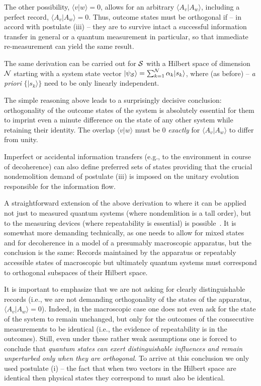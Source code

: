 \documentclass[aps,amsmath,amssymb,amsfonts,12pt]{revtex4-1}
\newcommand{\ket}[1]    {| #1 \rangle}
\newcommand{\bk}[2]     {\langle #1 | #2 \rangle}
\newcommand{\+}         {\dagger}
\begin{document}
The other possibility, $\bk v w = 0$, allows for an arbitrary $\bk {A_v} {A_w}$, including a perfect
record, $\bk {A_v} {A_w}=0$. Thus, outcome states must be orthogonal if -- in accord with postulate (iii) -- they are to survive intact a
successful information transfer in general or a quantum measurement in particular, so that immediate re-measurement can yield the same result.

The same derivation can be carried out for ${\cal S}$ with a Hilbert space of
dimension ${\cal N}$ starting with a system state vector $\ket {\psi_{\cal S}}=\sum_{k=1}^{\cal N}\alpha_k \ket {s_k}$,
where (as before) -- {\it a priori} $\{\ket {s_k} \}$ need to be only linearly independent.

The simple reasoning above leads to a surprisingly decisive conclusion: orthogonality of the outcome states of the system is absolutely
essential for them to imprint even a minute difference on the state of any other system while retaining their
identity. The overlap $\bk v  w$ must be 0 {\it exactly} for $\bk {A_v} {A_w}$ to differ from unity. 

Imperfect or accidental information transfers (e.g., to the environment in course of decoherence) can also define
preferred sets of states providing that the crucial nondemolition demand of postulate (iii) is imposed on the unitary evolution responsible for the information flow.

A straightforward extension of the above derivation to where it can be applied not just to measured quantum systems (where nondemlition is a tall order), but to the measuring devices (where repeatability is essential) is possible~\cite{79,Z2013}. It is somewhat more demanding technically, as one needs to allow for mixed states and for decoherence in a model of a presumably macroscopic apparatus, but the conclusion is the same: Records maintained by the apparatus or repeatably accessible states of macroscopic but ultimately quantum systems must correspond to orthogonal subspaces of their Hilbert space.

It is important to emphasize that we are not asking for clearly distinguishable records (i.e., we are not demanding orthogonality of the states of the apparatus, $\bk {A_v} {A_w}=0$). 
Indeed, in the macroscopic case \cite{Z2013} one does not even ask for the state of the system to remain unchanged, but only for the outcomes of the consecutive measurements to be identical (i.e., the evidence of repeatability is in the outcomes). Still, even under these rather weak assumptions one is forced to conclude that {\it quantum states can exert distinguishable influences and remain unperturbed only when they are orthogonal}. To arrive at this conclusion we only used postulate (i) --
the fact that when two vectors in the Hilbert space are identical then physical states they correspond
to must also be identical.
\end{document}
